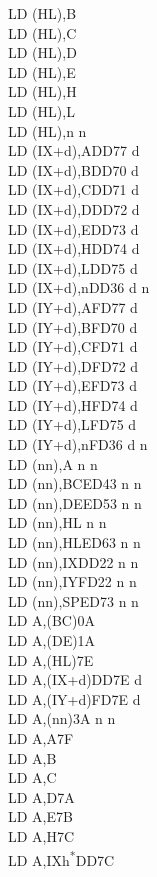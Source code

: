 \documentclass[oneside,a4paper]{book}
\begin{document}
\begin{multicols}{3}
{\begin{tabbing}
LD (HL),B\\
LD (HL),C\\
LD (HL),D\\
LD (HL),E\\
LD (HL),H\\
LD (HL),L\\
LD (HL),n n\\
LD (IX+d),A\>DD77 d\\
LD (IX+d),B\>DD70 d\\
LD (IX+d),C\>DD71 d\\
LD (IX+d),D\>DD72 d\\
LD (IX+d),E\>DD73 d\\
LD (IX+d),H\>DD74 d\\
LD (IX+d),L\>DD75 d\\
LD (IX+d),n\>DD36 d n\\
LD (IY+d),A\>FD77 d\\
LD (IY+d),B\>FD70 d\\
LD (IY+d),C\>FD71 d\\
LD (IY+d),D\>FD72 d\\
LD (IY+d),E\>FD73 d\\
LD (IY+d),H\>FD74 d\\
LD (IY+d),L\>FD75 d\\
LD (IY+d),n\>FD36 d n\\
LD (nn),A n n\\
LD (nn),BC\>ED43 n n\\
LD (nn),DE\>ED53 n n\\
LD (nn),HL n n\\
LD (nn),HL\>ED63 n n\\
LD (nn),IX\>DD22 n n\\
LD (nn),IY\>FD22 n n\\
LD (nn),SP\>ED73 n n\\
LD A,(BC)\>0A\\
LD A,(DE)\>1A\\
LD A,(HL)\>7E\\
LD A,(IX+d)\>DD7E d\\
LD A,(IY+d)\>FD7E d\\
LD A,(nn)\>3A n n\\
LD A,A\>7F\\
LD A,B\\
LD A,C\\
LD A,D\>7A\\
LD A,E\>7B\\
LD A,H\>7C\\
LD A,IXh\textsuperscript{*}\>DD7C\\

\end{tabbing}}
\end{multicols}
\end{document}
